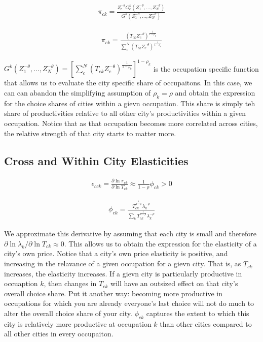 \documentclass[10pt]{article}
\begin{document}
\begin{align}
    \pi_{ck} = \frac{Z_c^{- \theta} G_c^k(Z_1^{- \theta}, \dots, Z_N^{- \theta})}{G^k(Z_1^{- \theta}, \dots, Z_N^{- \theta})}
\end{align}

\begin{align}
    \pi_{ck} = \frac{(T_{ck} Z_c^{-\theta})^{\frac{1}{1 - \rho_k}}}{\sum_{c}^{N} (T_{ck} Z_c^{-\theta})^{\frac{1}{1 - \rho_k}}}
    \label{city_occuaption_shares}
\end{align}

$G^k (Z_1^{-\theta}, \dots, Z_N^{-\theta}) = [\sum_{c}^{N} (T_{ck} Z_c^{-\theta})^{\frac{1}{1 - \rho_k}}]^{1 - \rho_k}$ is the occupation specific function that allows us to evaluate the city specific share of occupaitons. In this case, we can can abandon the simplifying assumption of $\rho_k = \rho$ and obtain the expression for the choice shares of cities within a gievn occupation. This share is simply teh share of productivities relative to all other city's productivities within a given occupation. Notice that as that occupation becomes more correlated across cities, the relative strength of that city starts to matter more.

\subsection{Cross and Within City Elasticities}

\begin{align}
    \epsilon_{cck} = \frac{\partial \ln \pi_{ck}}{\partial \ln T_{ck}} \approx \frac{1}{1 - \rho} \phi_{ck} > 0
\end{align}

\begin{align}
    \phi_{ck} = \frac{T_{ck}^{\frac{1}{1 - \rho}} \lambda_k^{- \rho}}{\sum_{k}^{} T_{ck}^{\frac{1}{1 - \rho}} \lambda_k^{- \rho}}
\end{align}

We approximate this derivative by assuming that each city is small and therefore $\partial \ln \lambda_k / \partial \ln T_{ck} \approx 0$. This allows us to obtain the expression for the elasticity of a city's own price. Notice that a city's own price elasticity is positive, and increasing in the relavance of a given occupation for a gievn city. That is, as $T_{ck}$ increases, the elasticity increases. If a gievn city is particularly productive in occuaption $k$, then changes in $T_{ck}$ will have an outsized effect on that city's overall choice share. Put it another way: becoming more productive in occupations for which you are already everyone's last choice will not do much to alter the overall choice share of your city. $\phi_{ck}$ captures the extent to which this city is relatively more productive at occupation $k$ than other cities compared to all other cities in every occupaiton.
\end{document}
